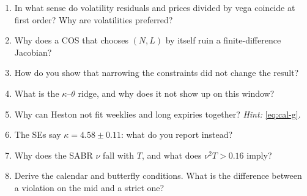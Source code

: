 \begin{domande}
\begin{enumerate}
\item In what sense do volatility residuals and prices divided by vega coincide at first order? Why are volatilities
preferred?
\item Why does a COS that chooses $(N,L)$ by itself ruin a finite-difference Jacobian?
\item How do you show that narrowing the constraints did not change the result?
\item What is the $\kappa$--$\theta$ ridge, and why does it not show up on this window?
\item Why can Heston not fit weeklies and long expiries together? \emph{Hint:} \eqref{eq:cal-g}.
\item The SEs say $\kappa=4.58\pm0.11$: what do you report instead?
\item Why does the SABR $\nu$ fall with $T$, and what does $\nu^2T>0.16$ imply?
\item Derive the calendar and butterfly conditions. What is the difference between a violation on the mid and a strict
one?
\end{enumerate}
\end{domande}
